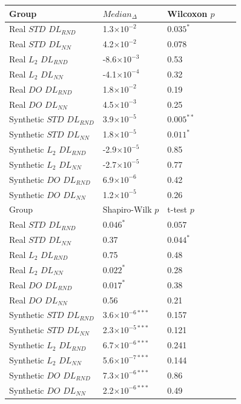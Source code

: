 \documentclass[conference]{IEEEtran}
\begin{document}
\begin{table}[tb]
 \begin{center}
 \begin{small}
 \begin{sc}
 \begin{tabular}{l|llll}
 
 \toprule
 Group & $Median_{\Delta}$ & Wilcoxon $p$ \\
 
 \midrule
 Real $STD$ $DL_{RND}$ & 1.3$\times10^{-2}$ & $0.035^{*}$ \\
 Real $STD$ $DL_{NN}$ & 4.2$\times10^{-2}$ & 0.078 \\
 Real $L_2$ $DL_{RND}$ & -8.6$\times10^{-3}$ & 0.53 \\
 Real $L_2$ $DL_{NN}$ & -4.1$\times10^{-4}$ & 0.32 \\
 Real $DO$ $DL_{RND}$ & 1.8$\times10^{-2}$ & 0.19 \\
 Real $DO$ $DL_{NN}$ & 4.5$\times10^{-3}$ & 0.25 \\
 
 \hline
 Synthetic $STD$ $DL_{RND}$ & 3.9$\times10^{-5}$ & $0.005^{**}$ \\
 Synthetic $STD$ $DL_{NN}$ & 1.8$\times10^{-5}$ & $0.011^{*}$ \\
 Synthetic $L_2$ $DL_{RND}$ & -2.9$\times10^{-5}$ & 0.85 \\
 Synthetic $L_2$ $DL_{NN}$ & -2.7$\times10^{-5}$ & 0.77 \\
 Synthetic $DO$ $DL_{RND}$ & 6.9$\times10^{-6}$ & 0.42 \\
 Synthetic $DO$ $DL_{NN}$ & 1.2$\times10^{-5}$ & 0.26 \\
 
 \bottomrule

 
 \toprule
 Group & Shapiro-Wilk $p$ & t-test $p$\\
 
 \midrule
 Real $STD$ $DL_{RND}$ & $0.046^{*}$ & $0.057$ \\
 Real $STD$ $DL_{NN}$ & 0.37 & $0.044^{*}$\\
 Real $L_2$ $DL_{RND}$ & 0.75 & 0.48 \\
 Real $L_2$ $DL_{NN}$ & $0.022^{*}$ & 0.28 \\
 Real $DO$ $DL_{RND}$ & $0.017^{*}$ & 0.38 \\
 Real $DO$ $DL_{NN}$ & 0.56 & 0.21 \\
 
 \hline
 Synthetic $STD$ $DL_{RND}$ & 3.6$\times10^{-6***}$ & 0.157\\
 Synthetic $STD$ $DL_{NN}$ & 2.3$\times10^{-5***}$ & 0.121 \\
 Synthetic $L_2$ $DL_{RND}$ & 6.7$\times10^{-6***}$ & 0.241\\
 Synthetic $L_2$ $DL_{NN}$ & 5.6$\times10^{-7***}$ & 0.144\\
 Synthetic $DO$ $DL_{RND}$ & 7.3$\times10^{-6***}$ & 0.86 \\
 Synthetic $DO$ $DL_{NN}$ & 2.2$\times10^{-6***}$ & 0.49 \\
 

\end{tabular}
\end{sc}
\end{small}
\end{center}
\end{table}
\end{document}
